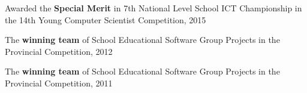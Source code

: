 
\begin{highlights}
   \item Awarded the \textbf{Special Merit} in 7th National Level School ICT Championship in the 14th Young Computer Scientist Competition, 2015
   \item The \textbf{winning team} of School Educational Software Group Projects in the Provincial Competition, 2012
   \item The \textbf{winning team} of School Educational Software Group Projects in the Provincial Competition, 2011
\end{highlights}
